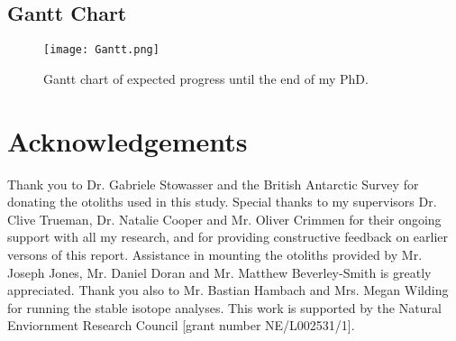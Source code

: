 \documentclass[12pt, titlepage]{article}
\begin{document}
\pagebreak
\begin{landscape}
\subsection{Gantt Chart}

\begin{figure}[H]
\texttt{[image: Gantt.png]}
\caption{Gantt chart of expected progress until the end of my PhD.}
\label{fig:Gantt}
\end{figure}

\end{landscape}

\pagebreak
\section{Acknowledgements}

Thank you to Dr. Gabriele Stowasser and the British Antarctic Survey for donating the otoliths used in this study.
Special thanks to my supervisors Dr. Clive Trueman, Dr. Natalie Cooper and Mr. Oliver Crimmen for their ongoing support with all my research, and for providing constructive feedback on earlier versons of this report.
Assistance in mounting the otoliths provided by Mr. Joseph Jones, Mr. Daniel Doran and Mr. Matthew Beverley-Smith is greatly appreciated.
Thank you also to Mr. Bastian Hambach and Mrs. Megan Wilding for running the stable isotope analyses.
This work is supported by the Natural Enviornment Research Council [grant number NE/L002531/1].

\pagebreak



\pagebreak
\appendix






\end{document}
